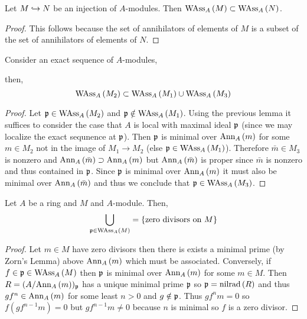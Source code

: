 \documentclass[12pt]{article}
\begin{document}
\begin{lemma}
Let $M \hookrightarrow N$ be an injection of $A$-modules. Then $\mathrm{WAss}_{A}\left(M \right) \subset \mathrm{WAss}_{A}\left(N \right)$.
\end{lemma}

\begin{proof}
This follows because the set of annihilators of elements of $M$ is a subset of the set of annihilators of elements of $N$.
\end{proof}

\begin{lemma} \label{exact_seq_weak_ass}
Consider an exact sequence of $A$-modules,
\begin{center}
\end{center}
then,
\[ \mathrm{WAss}_{A}\left(M_2 \right) \subset \mathrm{WAss}_{A}\left(M_1 \right) \cup \mathrm{WAss}_{A}\left(M_3 \right) \]
\end{lemma}

\begin{proof}
Let $\mathfrak{p} \in \mathrm{WAss}_{A}\left(M_2 \right)$ and $\mathfrak{p} \notin \mathrm{WAss}_{A}\left(M_1 \right)$. Using the previous lemma it suffices to consider the case that $A$ is local with maximal ideal $\mathfrak{p}$ (since we may localize the exact sequnence at $\mathfrak{p}$). 
Then $\mathfrak{p}$ is minimal over $\mathrm{Ann}_{A}\left(m\right)$ for some $m \in M_2$ not in the image of $M_1 \to M_2$ (else $\mathfrak{p} \in \mathrm{WAss}_{A}\left(M_1 \right)$). Therefore $\bar{m} \in M_3$ is nonzero and $\mathrm{Ann}_{A}\left(\bar{m}\right) \supset \mathrm{Ann}_{A}\left(m\right)$ but $\mathrm{Ann}_{A}\left(\bar{m}\right)$ is proper since $\bar{m}$ is nonzero and thus contained in $\mathfrak{p}$. Since $\mathfrak{p}$ is minimal over $\mathrm{Ann}_{A}\left(m\right)$ it must also be minimal over $\mathrm{Ann}_{A}\left(\bar{m}\right)$ and thus we conclude that $\mathfrak{p} \in \mathrm{WAss}_{A}\left(M_3 \right)$.
\end{proof}

\begin{lemma}
Let $A$ be a ring and $M$ and $A$-module. Then,
\[ \bigcup_{\mathfrak{p} \in \mathrm{WAss}_{A}\left(M \right)} = \{ \text{zero divisors on } M \} \]
\end{lemma}

\begin{proof}
Let $m \in M$ have zero divisors then there is exists a minimal prime (by Zorn's Lemma) above $\mathrm{Ann}_{A}\left(m\right)$ which must be associated. Conversely, if $f \in \mathfrak{p} \in \mathrm{WAss}_{A}\left(M \right)$ then $\mathfrak{p}$ is minimal over $\mathrm{Ann}_{A}\left(m\right)$ for some $m \in M$. Then $R = (A / \mathrm{Ann}_{A}\left(m\right))_{\mathfrak{p}}$ has a unique minimal prime $\mathfrak{p}$ so $\mathfrak{p} = \mathrm{nilrad}\left( R \right)$ and thus $g f^n \in \mathrm{Ann}_{A}\left(m\right)$ for some least $n > 0$ and $g \notin \mathfrak{p}$. Thus $g f^n m = 0$ so $f (g f^{n-1} m) = 0$ but $g f^{n-1} m \neq 0$ because $n$ is minimal so $f$ is a zero divisor.
\end{proof}
\end{document}
